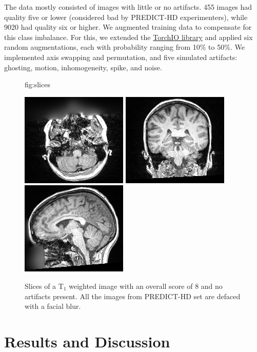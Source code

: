 \documentclass{midl} %
\begin{document}
The data mostly consisted of images with little or no artifacts. 455 images had quality five or lower (considered bad by PREDICT-HD experimenters), while 9020 had quality six or higher. We augmented training data to compensate for this class imbalance. For this, we extended the \href{https://torchio.readthedocs.io/transforms/augmentation.html}{TorchIO library} and applied six random augmentations, each with probability ranging from 10\% to 50\%. We implemented axis swapping and permutation, and five simulated artifacts: ghosting, motion, inhomogeneity, spike, and noise.


\begin{figure}[htbp]
\floatconts
  {fig:slices} %
  {\caption{Slices of a T$_1$ weighted image with an overall score of 8 and no artifacts present. All the images from PREDICT-HD set are defaced with a facial blur.}}
  {
  \includegraphics[width=0.32\linewidth]{axial.png}
  \includegraphics[width=0.32\linewidth]{coronal.png}
  \includegraphics[width=0.32\linewidth]{sagittal.png}
  }
\end{figure}

\section{Results and Discussion}
\end{document}

